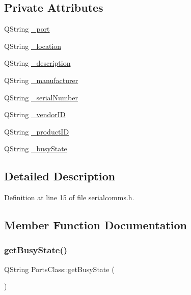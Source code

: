 \subsection*{Private Attributes}
\begin{DoxyCompactItemize}
\item 
Q\+String \mbox{\hyperlink{class_ports_class_a7b2aa52c2875846c58e565bed33df8cc}{\+\_\+port}}
\item 
Q\+String \mbox{\hyperlink{class_ports_class_a09cafbfc55f5da779cb33d7ab9a5d963}{\+\_\+location}}
\item 
Q\+String \mbox{\hyperlink{class_ports_class_abb945feb83936d92f49d2d83c9ffe9c7}{\+\_\+description}}
\item 
Q\+String \mbox{\hyperlink{class_ports_class_af8437a5a02dd31176ddc1fab5860c5fe}{\+\_\+manufacturer}}
\item 
Q\+String \mbox{\hyperlink{class_ports_class_a6da92952a206b58a2325cd8d3393c438}{\+\_\+serial\+Number}}
\item 
Q\+String \mbox{\hyperlink{class_ports_class_ac7fb67486a136f2a0667d2b4b1be403e}{\+\_\+vendor\+ID}}
\item 
Q\+String \mbox{\hyperlink{class_ports_class_abee7fa7a0c5b404bb642709d47720b4f}{\+\_\+product\+ID}}
\item 
Q\+String \mbox{\hyperlink{class_ports_class_a2b0fb1fe4e32ba5f05a3fe29433b2734}{\+\_\+busy\+State}}
\end{DoxyCompactItemize}


\subsection{Detailed Description}


Definition at line 15 of file serialcomms.\+h.



\subsection{Member Function Documentation}
\mbox{\label{class_ports_class_a2cfe00d894c50c8b175571455e293497}} 
\subsubsection{\texorpdfstring{getBusyState()}{getBusyState()}}
{\footnotesize\ttfamily Q\+String Ports\+Class\+::get\+Busy\+State (\begin{DoxyParamCaption}{ }\end{DoxyParamCaption})}



